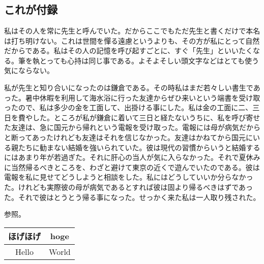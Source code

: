 \documentclass[./main]{subfiles}
\begin{document}
\appendix


\renewcommand{\thesubsection}{\Alph{subsection}}

\makeatletter
	\renewcommand{\theequation}{\thesubsection.\arabic{equation}}

	\renewcommand{\thefigure}{\thesubsection.\arabic{figure}}

	\renewcommand{\thetable}{\thesubsection.\arabic{table}}

\makeatother

\setcounter{equation}{0}

\section*{\appendixname}

\markboth{\appendixname}{}

\subsection{これが付録}
私はその人を常に先生と呼んでいた。だからここでもただ先生と書くだけで本名は打ち明けない。これは世間を憚る遠慮というよりも、その方が私にとって自然だからである。私はその人の記憶を呼び起すごとに、すぐ「先生」といいたくなる。筆を執とっても心持は同じ事である。よそよそしい頭文字などはとても使う気にならない。

私が先生と知り合いになったのは鎌倉である。その時私はまだ若々しい書生であった。暑中休暇を利用して海水浴に行った友達からぜひ来いという端書を受け取ったので、私は多少の金を工面して、出掛ける事にした。私は金の工面に二、三日を費やした。ところが私が鎌倉に着いて三日と経たないうちに、私を呼び寄せた友達は、急に国元から帰れという電報を受け取った。電報には母が病気だからと断ってあったけれども友達はそれを信じなかった。友達はかねてから国元にいる親たちに勧まない結婚を強いられていた。彼は現代の習慣からいうと結婚するにはあまり年が若過ぎた。それに肝心の当人が気に入らなかった。それで夏休みに当然帰るべきところを、わざと避けて東京の近くで遊んでいたのである。彼は電報を私に見せてどうしようと相談をした。私にはどうしていいか分らなかった。けれども実際彼の母が病気であるとすれば彼は固より帰るべきはずであった。それで彼はとうとう帰る事になった。せっかく来た私は一人取り残された\cite{こころ,力久夏実2014夏目漱石,荒井洋一2010夏目漱石の,渡邉久暢2015教室の中の文学}。

参照。

\begin{table}[hbtp]
	\centering
	\label{tbl:foo}
	\begin{tabular}{|c|c|}\hline
		ほげほげ & hoge \\\hline
		Hello & World \\\hline
	\end{tabular}
\end{table}
\end{document}
